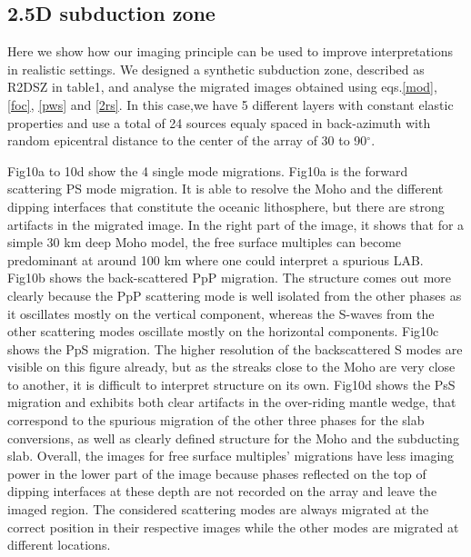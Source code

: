 \documentclass[9pt,a4paper]{article}
\numberwithin{equation}{section}
\begin{document}
\begin{multicols}{2}
\subsection{2.5D subduction zone}

Here we show how our imaging principle can be used to improve interpretations in realistic settings.
We designed a synthetic subduction zone, described as R2DSZ in table1, and analyse the migrated images obtained using eqs.\eqref{mod}, \eqref{foc}, \eqref{pws} and \eqref{2rs}.
In this case,we have 5 different layers with constant elastic properties and use a total of 24 sources equaly spaced in back-azimuth with random epicentral distance to the center of the array of 30 to 90$^{\circ}$.

Fig10a to 10d show the 4 single mode migrations.
Fig10a is the forward scattering PS mode migration.
It is able to resolve the Moho and the different dipping interfaces that constitute the oceanic lithosphere, but there are strong artifacts in the migrated image.
In the right part of the image, it shows that for a simple 30 km deep Moho model, the free surface multiples can become predominant at around 100 km where one could interpret a spurious LAB.
Fig10b shows the back-scattered PpP migration.
The structure comes out more clearly because the PpP scattering mode is well isolated from the other phases as it oscillates mostly on the vertical component, whereas the S-waves from the other scattering modes oscillate mostly on the horizontal components.
Fig10c shows the PpS migration.
The higher resolution of the backscattered S modes are visible on this figure already, but as the streaks close to the Moho are very close to another, it is difficult to interpret structure on its own.
Fig10d shows the PsS migration and exhibits both clear artifacts in the over-riding mantle wedge, that correspond to the spurious migration of the other three phases for the slab conversions, as well as clearly defined structure for the Moho and the subducting slab.
Overall, the images for free surface multiples’ migrations have less imaging power in the lower part of the image because phases reflected on the top of dipping interfaces at these depth are not recorded on the array and leave the imaged region.
The considered scattering modes are always migrated at the correct position in their respective images while the other modes are migrated at different locations. 


\end{multicols}
\end{document}
